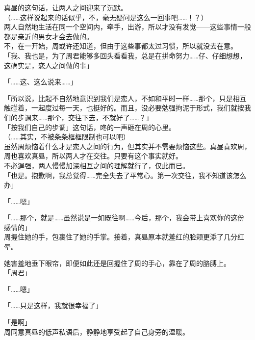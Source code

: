 真昼的这句话，让两人之间迎来了沉默。\\

（……这样说起来的话似乎，不，毫无疑问是这么一回事吧……！？）\\

两人自然地生活在同一个空间内，牵手，出游，所以才没有发觉——这些事情一般都是亲近的男女才会去做的。\\

不，在一开始，周或许还知道，但由于这些事都太过习惯，所以就没去在意。\\

「我、我也是，为了周君能够多回头看看我，总是在拼命努力……仔、仔细想想，这确实是，恋人之间做的事」

「……这、这么说来……」

「所以说，比起不自然地意识到我们是恋人，不如和平时一样……那个，只是相互触碰着，一起度过每一天，也挺好的。而且，没必要勉强拘泥于形式，我们就按我们的步调来……那个，交往下去，不就好了……？」\\

「按我们自己的步调」这句话，咚的一声砸在周的心里。\\

（……其实，不被条条框框限制也可以吧）\\

虽然周烦恼着什么才是恋人之间的行为，但其实并不需要烦恼这些。真昼喜欢周，周也喜欢真昼，所以两人才在交往。只要有这个事实就好。\\

不必逞强，两人慢慢加深相互之间的理解就行了，仅此而已。\\

「也是。抱歉啊，我总觉得……完全失去了平常心。第一次交往，我不知道该怎么办」

「……嗯」

「……那个，就是……虽然说是一如既往啊……今后，那个，我会带上喜欢你的这份感情的」\\

周握住她的手，包裹住了她的手掌。接着，真昼原本就羞红的脸颊更添了几分红晕。

她害羞地垂下眼帘，即便如此还是回握住了周的手心，靠在了周的胳膊上。\\

「周君」

「……嗯」

「……只是这样，我就很幸福了」

「是啊」\\

周同意真昼的低声私语后，静静地享受起了自己身旁的温暖。\\
